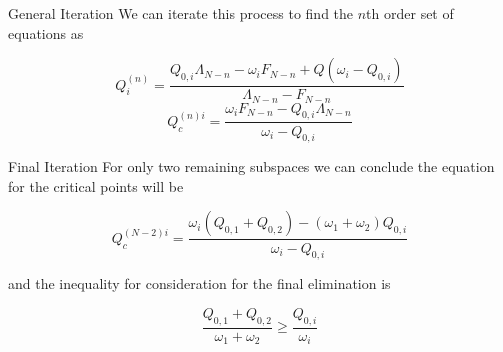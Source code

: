 \documentclass{beamer}
\begin{document}
\begin{frame}{General Iteration}
We can iterate this process to find the $n$th order set of equations as

\[  Q^{(n)}_i = \frac{ Q_{0,i}\Lambda_{N-n}  -  \omega_{i} F_{N-n} + Q( \omega_i - Q_{0,i} ) }{\Lambda_{N-n} - F_{N-n}}\]
\[Q^{(n)i}_c = \frac{ \omega_{i} F_{N-n} -  Q_{0,i}\Lambda_{N-n}}{\omega_i - Q_{0,i}}\]

\end{frame}
\begin{frame}{Final Iteration}
For only two remaining subspaces we can conclude the equation for the critical points will be

\[Q^{(N-2)i}_c = \frac{ \omega_{i} (Q_{0,1} + Q_{0,2}) -  (\omega_1+\omega_2)Q_{0,i}}{\omega_i - Q_{0,i}}\]

and the inequality for consideration for the final elimination is

\[\frac{Q_{0,1} + Q_{0,2}}{\omega_1 + \omega_2} \geq \frac{Q_{0,i}}{\omega_i}\]
\end{frame}
\end{document}
